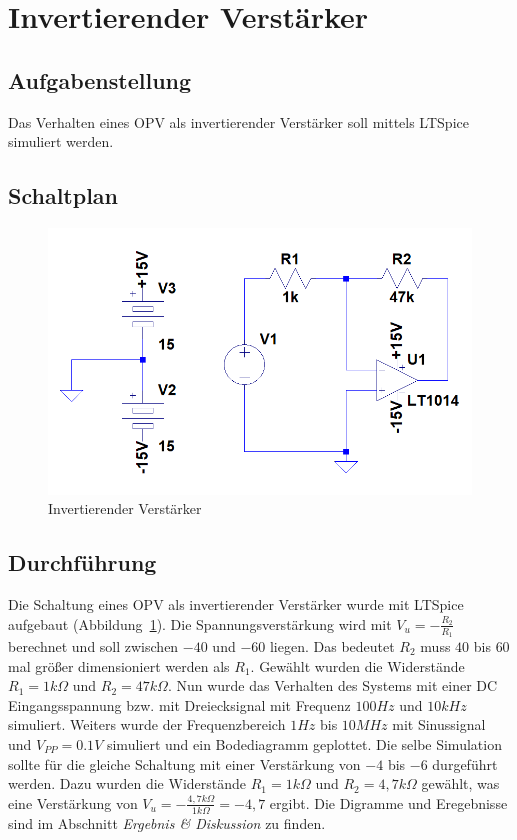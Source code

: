 \documentclass[12pt,a4paper,titlepage]{article}
\begin{document}
\section{Invertierender Verst\"arker}

\subsection{Aufgabenstellung}
Das Verhalten eines OPV als invertierender Verst\"arker soll mittels LTSpice simuliert werden.

\subsection{Schaltplan}
\begin{figure}[H]
  \centering
  \includegraphics{invertierend_schaltung}
  \caption{Invertierender Verst\"arker}
  \label{figure11}
\end{figure}

\subsection{Durchf\"uhrung}
Die Schaltung eines OPV als invertierender Verst\"arker wurde mit LTSpice aufgebaut (Abbildung~\ref{figure11}). Die Spannungsverst\"arkung wird mit $V_u = -\frac{R_2}{R_1}$ berechnet und soll zwischen $-40$ und $-60$ liegen. Das bedeutet $R_2$ muss $40$ bis $60$ mal gr\"o\ss er dimensioniert werden als $R_1$. Gew\"ahlt wurden die Widerst\"ande $R_1 = 1k\Omega$ und $R_2 = 47k\Omega$. Nun wurde das Verhalten des Systems mit einer DC Eingangsspannung bzw. mit Dreiecksignal mit Frequenz $100Hz$ und $10kHz$ simuliert. Weiters wurde der Frequenzbereich $1Hz$ bis $10MHz$ mit Sinussignal und $V_{PP} = 0.1V$ simuliert und ein Bodediagramm geplottet. Die selbe Simulation sollte f\"ur die gleiche Schaltung mit einer Verst\"arkung von $-4$ bis $-6$ durgef\"uhrt werden. Dazu wurden die Widerst\"ande $R_1 = 1k\Omega$ und $R_2 = 4,7k\Omega$ gew\"ahlt, was eine Verst\"arkung von $V_u = -\frac{4,7k\Omega}{1k\Omega} = -4,7$ ergibt. Die Digramme und Eregebnisse sind im Abschnitt \textit{Ergebnis \& Diskussion} zu finden. \\
\end{document}
